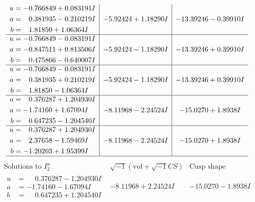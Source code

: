 \documentclass[1p]{elsarticle_modified}
\theoremstyle{definition}
\newcommand{\I}{\sqrt{-1}}
\begin{document}
$$\begin{array}{c|c|c}
\begin{aligned}
u &= -0.766849 + 0.083191 I \\
a &= \phantom{-}0.381935 - 0.210219 I \\
b &= \phantom{-}1.81850 + 1.06364 I\end{aligned}
 & -5.92424 + 1.18290 I & -13.39246 - 0.39910 I \\ \hline\begin{aligned}
u &= -0.766849 - 0.083191 I \\
a &= -0.847511 + 0.813506 I \\
b &= \phantom{-}0.475866 - 0.640007 I\end{aligned}
 & -5.92424 - 1.18290 I & -13.39246 + 0.39910 I \\ \hline\begin{aligned}
u &= -0.766849 - 0.083191 I \\
a &= \phantom{-}0.381935 + 0.210219 I \\
b &= \phantom{-}1.81850 - 1.06364 I\end{aligned}
 & -5.92424 - 1.18290 I & -13.39246 + 0.39910 I \\ \hline\begin{aligned}
u &= \phantom{-}0.376287 + 1.204930 I \\
a &= -1.74160 + 1.67094 I \\
b &= \phantom{-}0.647235 - 1.204540 I\end{aligned}
 & -8.11968 - 2.24524 I & -15.0270 + 1.8938 I \\ \hline\begin{aligned}
u &= \phantom{-}0.376287 + 1.204930 I \\
a &= \phantom{-}2.37658 - 1.59469 I \\
b &= -1.20203 + 1.95399 I\end{aligned}
 & -8.11968 - 2.24524 I & -15.0270 + 1.8938 I\\
 \hline 
 \end{array}$$\newpage$$\begin{array}{c|c|c}  
\text{Solutions to }I^u_{2}& \I (\text{vol} + \sqrt{-1}CS) & \text{Cusp shape}\\
 \hline 
\begin{aligned}
u &= \phantom{-}0.376287 - 1.204930 I \\
a &= -1.74160 - 1.67094 I \\
b &= \phantom{-}0.647235 + 1.204540 I\end{aligned}
 & -8.11968 + 2.24524 I & -15.0270 - 1.8938 I \\ \hline\begin{aligned}

\end{aligned}
\end{array}$$
\end{document}
